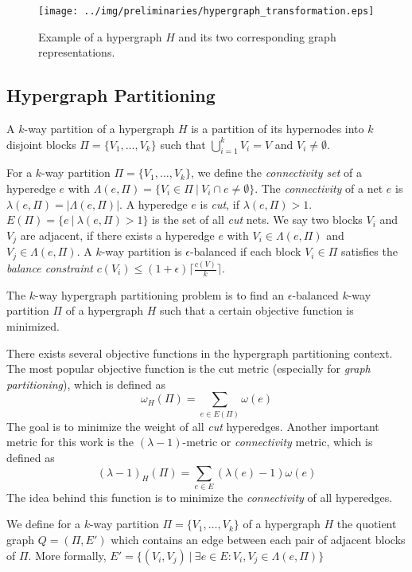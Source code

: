 \begin{figure}
\centering
\texttt{[image: ../img/preliminaries/hypergraph\_transformation.eps]}
\caption{Example of a hypergraph $H$ and its two corresponding graph representations.} 
\label{img:hypergraph_transformation}
\end{figure}

\subsection{Hypergraph Partitioning}
\label{sec:hypergraph_partitioning}

\begin{definition}
A $k$-way partition of a hypergraph $H$ is a partition of its hypernodes into
$k$ disjoint blocks $\Pi = \{V_1,\ldots,V_k\}$ such that $\bigcup_{i=1}^{k} V_i = V$
and $V_i \neq \emptyset$.
\label{def:kway_partition}
\end{definition}

For a $k$-way partition $\Pi = \{V_1,\ldots,V_k\}$, we define the \emph{connectivity set} of a
hyperedge $e$ with $\Lambda(e,\Pi) = \{V_i \in \Pi\ |\ V_i \cap e \neq \emptyset\}$. The \emph{connectivity}
of a net $e$ is $\lambda(e,\Pi) = |\Lambda(e,\Pi)|$. A hyperedge $e$ is \emph{cut}, if
$\lambda(e,\Pi) > 1$. $E(\Pi) = \{e\ |\ \lambda(e,\Pi) > 1\}$ is the set of all \emph{cut} 
nets. We say two blocks $V_i$ and $V_j$ are adjacent, if there exists a hyperedge
$e$ with $V_i \in \Lambda(e,\Pi)$ and $V_j \in \Lambda(e,\Pi)$. 
A $k$-way partition is $\epsilon$-balanced 
if each block $V_i \in \Pi$ satisfies the \emph{balance constraint} 
$c(V_i) \le (1+\epsilon)\lceil\frac{c(V)}{k}\rceil$.

\begin{definition}
The $k$-way hypergraph partitioning problem is to find an $\epsilon$-balanced $k$-way
partition $\Pi$ of a hypergraph $H$ such that a certain objective function is minimized.
\label{def:kway_partitioning_problem}
\end{definition}

There exists several objective functions in the hypergraph partitioning context. 
The most popular objective function 
is the $\text{cut}$ metric (especially for \emph{graph partitioning}), which is defined as
\[\omega_H(\Pi) = \sum_{e \in E(\Pi)} \omega(e)\]
The goal is to minimize the weight of all \emph{cut} hyperedges. Another important metric
for this work is the $(\lambda - 1)$-metric or \emph{connectivity} metric, 
which is defined as
\[(\lambda - 1)_H(\Pi) = \sum_{e \in E} (\lambda(e) - 1)\omega(e)\]
The idea behind this function is to minimize the \emph{connectivity} of all hyperedges.

\begin{definition}
We define for a $k$-way partition $\Pi = \{V_1,\ldots,V_k\}$ of a hypergraph $H$ 
the quotient graph $Q = (\Pi,E')$ which contains an 
edge between each pair of adjacent blocks of $\Pi$.
More formally, $E' = \{(V_i,V_j)\ |\ \exists e \in E: V_i,V_j \in \Lambda(e,\Pi)\}$
\label{def:quotient_graph}
\end{definition}